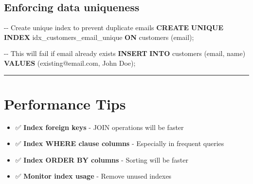 \documentclass[
]{report}
\newenvironment{Shaded}{\begin{snugshade}}{\end{snugshade}}
\newcommand{\CommentTok}[1]{\textcolor[rgb]{0.37,0.37,0.37}{#1}}
\newcommand{\KeywordTok}[1]{\textcolor[rgb]{0.00,0.23,0.31}{\textbf{#1}}}
\newcommand{\NormalTok}[1]{\textcolor[rgb]{0.00,0.23,0.31}{#1}}
\newcommand{\StringTok}[1]{\textcolor[rgb]{0.13,0.47,0.30}{#1}}
\providecommand{\tightlist}{%
  \setlength{\itemsep}{0pt}\setlength{\parskip}{0pt}}\usepackage{longtable,booktabs,array}
\begin{document}
\subsection{Enforcing data uniqueness}\label{enforcing-data-uniqueness}

\begin{Shaded}
\begin{Highlighting}[]
\CommentTok{{-}{-} Create unique index to prevent duplicate emails}
\KeywordTok{CREATE} \KeywordTok{UNIQUE} \KeywordTok{INDEX}\NormalTok{ idx\_customers\_email\_unique }
\KeywordTok{ON}\NormalTok{ customers (email);}

\CommentTok{{-}{-} This will fail if email already exists}
\KeywordTok{INSERT} \KeywordTok{INTO}\NormalTok{ customers (email, name) }
\KeywordTok{VALUES}\NormalTok{ (}\StringTok{\textquotesingle{}existing@email.com\textquotesingle{}}\NormalTok{, }\StringTok{\textquotesingle{}John Doe\textquotesingle{}}\NormalTok{);}
\end{Highlighting}
\end{Shaded}

\begin{center}\rule{0.5\linewidth}{0.5pt}\end{center}

\section{Performance Tips}\label{performance-tips}

\begin{itemize}
\tightlist
\item
  ✅ \textbf{Index foreign keys} - JOIN operations will be faster
\end{itemize}

\begin{itemize}
\tightlist
\item
  ✅ \textbf{Index WHERE clause columns} - Especially in frequent
  queries
\end{itemize}

\begin{itemize}
\tightlist
\item
  ✅ \textbf{Index ORDER BY columns} - Sorting will be faster
\end{itemize}

\begin{itemize}
\tightlist
\item
  ✅ \textbf{Monitor index usage} - Remove unused indexes
\end{itemize}
\end{document}
